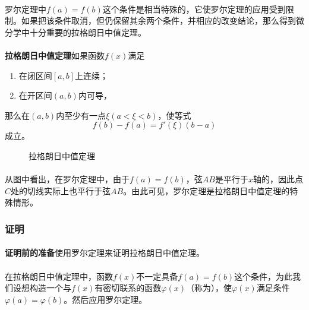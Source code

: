 \paragraph{}
罗尔定理中$f(a)=f(b)$这个条件是相当特殊的，它使罗尔定理的应用受到限制。如果把该条件取消，但仍保留其余两个条件，并相应的改变结论，那么得到微分学中十分重要的拉格朗日中值定理。

\paragraph{}
\textbf{拉格朗日中值定理\;}如果函数$f(x)$满足
\begin{enumerate}
  \item 在闭区间$[a,b]$上连续；
  \item 在开区间$(a,b)$内可导，
\end{enumerate}
那么在$(a,b)$内至少有一点$\xi(a < \xi < b)$，使等式
\begin{equation}
  f(b) - f(a) = f'(\xi)(b-a)
\end{equation}
成立。

\begin{figure}[H]
  \centering
    
    \caption{拉格朗日中值定理}
    \label{Lagrange‘s mean value theorem}
\end{figure}

\paragraph{}
从图中看出，在罗尔定理中，由于$f(a)=f(b)$，弦$AB$是平行于$x$轴的，因此点$C$处的切线实际上也平行于弦$AB$。由此可见，罗尔定理是拉格朗日中值定理的特殊情形。

\subsubsection{证明}
\paragraph{}
\textbf{证明前的准备\;}使用罗尔定理来证明拉格朗日中值定理。

\paragraph{}
在拉格朗日中值定理中，函数$f(x)$不一定具备$f(a)=f(b)$这个条件，为此我们设想构造一个与$f(x)$有密切联系的函数$\varphi(x)$（称为），使$\varphi(x)$满足条件$\varphi(a) = \varphi(b)$。然后应用罗尔定理。

